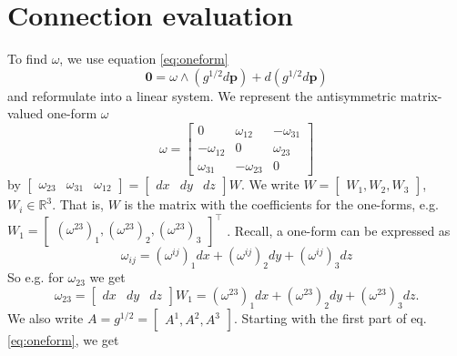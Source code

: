 \documentclass[../thesis.tex]{subfiles}
\begin{document}
\section{Connection evaluation}\label{sec:evaluation}
To find $\omega$, we use equation \ref{eq:oneform}
$$\bm{0} = \omega \wedge (g^{1/2}d\bm{p})+ d(g^{1/2}d\bm{p})$$
and reformulate into a linear system.
We represent the antisymmetric matrix-valued one-form $\omega$
$$\omega = \begin{bmatrix}
 0 & \omega_{12} & -\omega_{31} \\
 -\omega_{12} & 0 & \omega_{23} \\
 \omega_{31} & -\omega_{23} & 0
\end{bmatrix}$$
by $
\begin{bmatrix}
  \omega_{23} & \omega_{31} & \omega_{12}
\end{bmatrix} = 
\begin{bmatrix}
  dx & dy & dz
\end{bmatrix} W$. We write $W=\begin{bmatrix}
  W_1,W_2,W_3
\end{bmatrix}$, $W_i \in \mathbb{R}^3$. That is, $W$ is the matrix with the coefficients for the one-forms, e.g.
$W_1 = \begin{bmatrix}
  (\omega^{23})_1, (\omega^{23})_2, (\omega^{23})_3
\end{bmatrix}^{\top}$
.
Recall, a one-form can be expressed as
$$
\omega_{ij}= (\omega^{ij})_1dx + (\omega^{ij})_2dy + (\omega^{ij})_3dz
$$
So e.g. for $\omega_{23}$ we get $$\omega_{23} = \begin{bmatrix}
  dx & dy & dz
\end{bmatrix}W_1 = (\omega^{23})_1dx + (\omega^{23})_2dy + (\omega^{23})_3dz.$$
We also write $A = g^{1/2}= \begin{bmatrix}
  A^1, A^2, A^3
\end{bmatrix}$.
Starting with the first part of eq. \ref{eq:oneform}, we get
\end{document}
